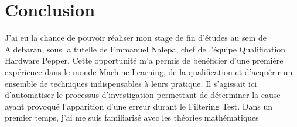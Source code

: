 \chapter{Conclusion}
\label{Conclusion}
\thispagestyle{fancy}

J'ai eu la chance de pouvoir réaliser mon stage de fin d'études au sein de Aldebaran, sous la tutelle de Emmanuel Nalepa, chef de l'équipe Qualification Hardware Pepper. Cette opportunité m’a permis de bénéficier d’une première expérience dans le monde Machine Learning, de la qualification et d’acquérir un ensemble de techniques indispensables à leurs pratique. Il s’agissait ici d'automatiser le processus d'investigation permettant de déterminer la cause ayant provoqué l'apparition d'une erreur durant le Filtering Test.
\newline
\newline
Dans un premier temps, j'ai me suis familiarisé avec les théories mathématiques 
